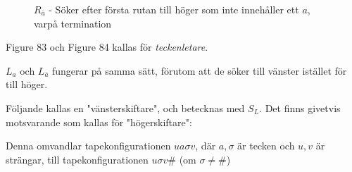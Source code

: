 \begin{figure}[ht!]
    \centering
    \caption{$R_{\bar{a}}$ - Söker efter första rutan till höger som inte innehåller ett $a$, varpå termination}
\end{figure}\par
\noindent Figure 83 och Figure 84 kallas för \textit{teckenletare}.\par
\noindent $L_a$ och $L_{\bar{a}}$ fungerar på samma sätt, förutom att de söker till vänster istället för till höger.
\par\bigskip
\noindent Följande kallas en "vänsterskiftare", och betecknas med $S_L$. Det finns givetvis motsvarande som kallas för "högerskiftare":
\begin{figure}[ht!]
    \centering
    \caption{}
\end{figure}
\par\bigskip
\noindent Denna omvandlar tapekonfigurationen $ua\sigma v$, där $a,\sigma$ är tecken och $u,v$ är strängar, till tapekonfigurationen $u\sigma v\#$ (om $\sigma\neq\#$)
